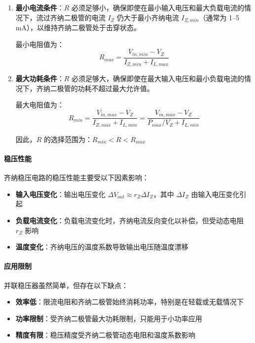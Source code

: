 \begin{enumerate}
  \item \textbf{最小电流条件}：$R$ 必须足够小，确保即使在最小输入电压和最大负载电流的情况下，流过齐纳二极管的电流 $I_Z$ 仍大于最小齐纳电流 $I_{Z,min}$（通常为 1--5 mA），以维持齐纳二极管处于击穿状态。

  最小电阻值为：
  \begin{equation}
  R_{max} = \frac{V_{in,min} - V_Z}{I_{Z,min} + I_{L,max}} \label{eq:zener-r-min}
  \end{equation}

  \item \textbf{最大功耗条件}：$R$ 必须足够大，确保即使在最大输入电压和最小负载电流的情况下，齐纳二极管的功耗不超过最大允许值。

  最大电阻值为：
  \begin{equation}
  R_{min} = \frac{V_{in,max} - V_Z}{I_{Z,max} + I_{L,min}} = \frac{V_{in,max} - V_Z}{P_{max}/V_Z + I_{L,min}} \label{eq:zener-r-max}
  \end{equation}

  因此，$R$ 的选择范围为：$R_{min} < R < R_{max}$
\end{enumerate}

\paragraph{稳压性能}

齐纳稳压电路的稳压性能主要受以下因素影响：

\begin{itemize}
  \item \textbf{输入电压变化}：输出电压变化 $\Delta V_{out} \approx r_Z \Delta I_Z$，其中 $\Delta I_Z$ 由输入电压变化引起
  \item \textbf{负载电流变化}：负载电流变化时，齐纳电流反向变化以补偿，但受动态电阻 $r_Z$ 影响
  \item \textbf{温度变化}：齐纳电压的温度系数导致输出电压随温度漂移
\end{itemize}

\paragraph{应用限制}

并联稳压器虽然简单，但存在以下缺点：

\begin{itemize}
  \item \textbf{效率低}：限流电阻和齐纳二极管始终消耗功率，特别是在轻载或无载情况下
  \item \textbf{功率限制}：受齐纳二极管最大功耗限制，只能用于小功率应用
  \item \textbf{精度有限}：稳压精度受齐纳二极管动态电阻和温度系数影响
\end{itemize}

